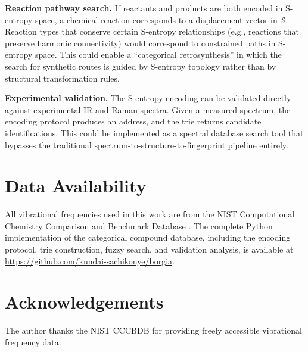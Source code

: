 \documentclass[11pt,a4paper]{article}
\theoremstyle{definition}
\theoremstyle{remark}
\newcommand{\Sspace}{\mathcal{S}}
\begin{document}
\textbf{Reaction pathway search.} If reactants and products are both encoded in S-entropy space, a chemical reaction corresponds to a displacement vector in $\Sspace$. Reaction types that conserve certain S-entropy relationships (e.g., reactions that preserve harmonic connectivity) would correspond to constrained paths in S-entropy space. This could enable a ``categorical retrosynthesis'' in which the search for synthetic routes is guided by S-entropy topology rather than by structural transformation rules.

\textbf{Experimental validation.} The S-entropy encoding can be validated directly against experimental IR and Raman spectra. Given a measured spectrum, the encoding protocol produces an address, and the trie returns candidate identifications. This could be implemented as a spectral database search tool that bypasses the traditional spectrum-to-structure-to-fingerprint pipeline entirely.

\section*{Data Availability}

All vibrational frequencies used in this work are from the NIST Computational Chemistry Comparison and Benchmark Database \citep{johnson2022}. The complete Python implementation of the categorical compound database, including the encoding protocol, trie construction, fuzzy search, and validation analysis, is available at \url{https://github.com/kundai-sachikonye/borgia}.

\section*{Acknowledgements}

The author thanks the NIST CCCBDB for providing freely accessible vibrational frequency data.



\end{document}
